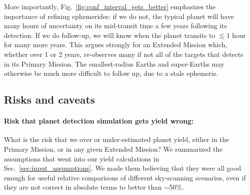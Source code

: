 More importantly, Fig.~\ref{fig:conf_interval_gets_better} emphasizes the importance of refining \tesss ephemerides: if we do not, the typical \tess planet will have many hours of uncertainty on its mid-transit time a few years following its detection.
If we do follow-up, we will know when the planet transits to $\lesssim1$ hour for many more years.
This argues strongly for an Extended Mission which, whether over 1 or 2 years, re-observes many if not all of the targets that \tess detects in its Primary Mission. 
The smallest-radius Earths and super-Earths may otherwise be much more difficult
to follow up, due to a stale ephemeris.


\subsection{Risks and caveats}
\label{sec:risks_caveats}
\paragraph{Risk that planet detection simulation gets yield wrong:}
What is the risk that we over or under-estimated \tesss planet yield, either in the Primary Mission, or in any given Extended Mission?
We summarized the assumptions that went into our yield calculations in Sec.~\ref{sec:input_assumptions}.
We made them believing that they were all good enough for useful relative comparisons of different sky-scanning scenarios,
even if they are not correct in absolute terms to better than $\sim$50\%.

